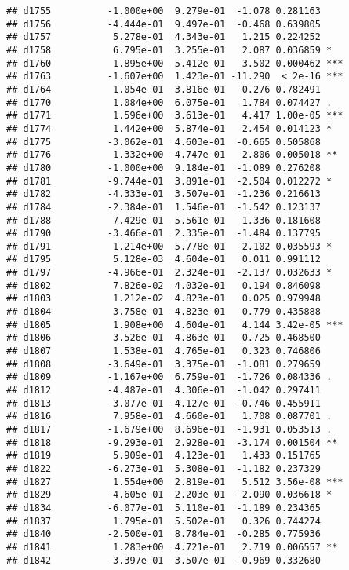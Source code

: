 \documentclass[
]{article}
\begin{document}
\begin{verbatim}
## d1755          -1.000e+00  9.279e-01  -1.078 0.281163    
## d1756          -4.444e-01  9.497e-01  -0.468 0.639805    
## d1757           5.278e-01  4.343e-01   1.215 0.224252    
## d1758           6.795e-01  3.255e-01   2.087 0.036859 *  
## d1760           1.895e+00  5.412e-01   3.502 0.000462 ***
## d1763          -1.607e+00  1.423e-01 -11.290  < 2e-16 ***
## d1764           1.054e-01  3.816e-01   0.276 0.782491    
## d1770           1.084e+00  6.075e-01   1.784 0.074427 .  
## d1771           1.596e+00  3.613e-01   4.417 1.00e-05 ***
## d1774           1.442e+00  5.874e-01   2.454 0.014123 *  
## d1775          -3.062e-01  4.603e-01  -0.665 0.505868    
## d1776           1.332e+00  4.747e-01   2.806 0.005018 ** 
## d1780          -1.000e+00  9.184e-01  -1.089 0.276208    
## d1781          -9.744e-01  3.891e-01  -2.504 0.012272 *  
## d1782          -4.333e-01  3.507e-01  -1.236 0.216613    
## d1784          -2.384e-01  1.546e-01  -1.542 0.123137    
## d1788           7.429e-01  5.561e-01   1.336 0.181608    
## d1790          -3.466e-01  2.335e-01  -1.484 0.137795    
## d1791           1.214e+00  5.778e-01   2.102 0.035593 *  
## d1795           5.128e-03  4.604e-01   0.011 0.991112    
## d1797          -4.966e-01  2.324e-01  -2.137 0.032633 *  
## d1802           7.826e-02  4.032e-01   0.194 0.846098    
## d1803           1.212e-02  4.823e-01   0.025 0.979948    
## d1804           3.758e-01  4.823e-01   0.779 0.435888    
## d1805           1.908e+00  4.604e-01   4.144 3.42e-05 ***
## d1806           3.526e-01  4.863e-01   0.725 0.468500    
## d1807           1.538e-01  4.765e-01   0.323 0.746806    
## d1808          -3.649e-01  3.375e-01  -1.081 0.279659    
## d1809          -1.167e+00  6.759e-01  -1.726 0.084336 .  
## d1812          -4.487e-01  4.306e-01  -1.042 0.297411    
## d1813          -3.077e-01  4.127e-01  -0.746 0.455911    
## d1816           7.958e-01  4.660e-01   1.708 0.087701 .  
## d1817          -1.679e+00  8.696e-01  -1.931 0.053513 .  
## d1818          -9.293e-01  2.928e-01  -3.174 0.001504 ** 
## d1819           5.909e-01  4.123e-01   1.433 0.151765    
## d1822          -6.273e-01  5.308e-01  -1.182 0.237329    
## d1827           1.554e+00  2.819e-01   5.512 3.56e-08 ***
## d1829          -4.605e-01  2.203e-01  -2.090 0.036618 *  
## d1834          -6.077e-01  5.110e-01  -1.189 0.234365    
## d1837           1.795e-01  5.502e-01   0.326 0.744274    
## d1840          -2.500e-01  8.784e-01  -0.285 0.775936    
## d1841           1.283e+00  4.721e-01   2.719 0.006557 ** 
## d1842          -3.397e-01  3.507e-01  -0.969 0.332680    

\end{verbatim}
\end{document}
